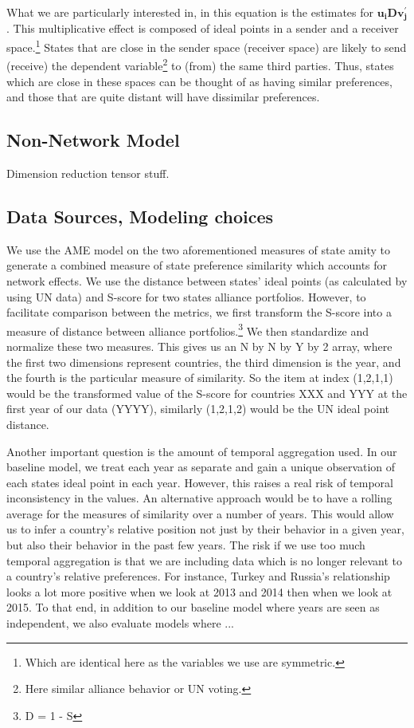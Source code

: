 \documentclass[fignum,letterpaper,12pt]{amsart}
\begin{document}
What we are particularly interested in, in this equation is the estimates for $\mathbf{u_{i}Dv^{'}_{j}}$. This multiplicative effect is composed of ideal points in a sender and a receiver space.\footnote{Which are identical here as the variables we use are symmetric.} States that are close in the sender space (receiver space) are likely to send (receive) the dependent variable\footnote{Here similar alliance behavior or UN voting.} to (from) the same third parties. Thus, states which are close in these spaces can be thought of as having similar preferences, and those that are quite distant will have dissimilar preferences.


\subsection{Non-Network Model}
Dimension reduction tensor stuff.

\subsection{Data Sources, Modeling choices}
We use the AME model on the two aforementioned measures of state amity to generate a combined measure of state preference similarity which accounts for network effects. We use the distance between states' ideal points (as calculated by \citet{voeten:XXXX} using UN data) and S-score for two states alliance portfolios. However, to facilitate comparison between the metrics, we first transform the S-score into a measure of distance between alliance portfolios.\footnote{D = 1 - S} We then standardize and normalize these two measures. This gives us an N by N by Y by 2 array, where the first two dimensions represent countries, the third dimension is the year, and the fourth is the particular measure of similarity. So the item at index (1,2,1,1) would be the transformed value of the S-score for countries XXX and YYY at the first year of our data (YYYY), similarly (1,2,1,2) would be the UN ideal point distance.

Another important question is the amount of temporal aggregation used. In our baseline model, we treat each year as separate and gain a unique observation of each states ideal point in each year. However, this raises a real risk of temporal inconsistency in the values. An alternative approach would be to have a rolling average for the measures of similarity over a number of years. This would allow us to infer a country's relative position not just by their behavior in a given year, but also their behavior in the past few years. The risk if we use too much temporal aggregation is that we are including data which is no longer relevant to a country's relative preferences. For instance, Turkey and Russia's relationship looks a lot more positive when we look at 2013 and 2014 then when we look at 2015. To that end, in addition to our baseline model where years are seen as independent, we also evaluate models where ... 
\end{document}
